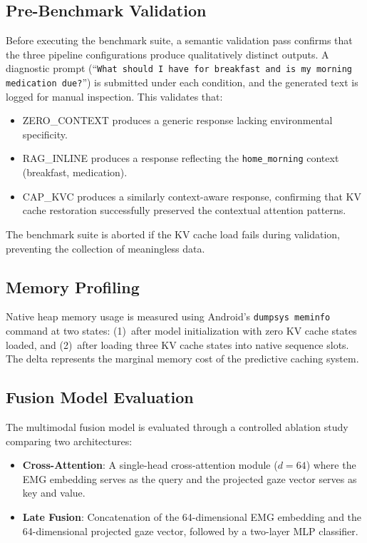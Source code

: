 \subsection{Pre-Benchmark Validation}
\label{sec:validation}

Before executing the benchmark suite, a semantic validation pass confirms that the three pipeline configurations produce qualitatively distinct outputs. A diagnostic prompt (``\texttt{What should I have for breakfast and is my morning medication due?}'') is submitted under each condition, and the generated text is logged for manual inspection. This validates that:

\begin{itemize}
    \item ZERO\_CONTEXT produces a generic response lacking environmental specificity.
    \item RAG\_INLINE produces a response reflecting the \texttt{home\_morning} context (breakfast, medication).
    \item CAP\_KVC produces a similarly context-aware response, confirming that KV cache restoration successfully preserved the contextual attention patterns.
\end{itemize}

The benchmark suite is aborted if the KV cache load fails during validation, preventing the collection of meaningless data.

\subsection{Memory Profiling}
\label{sec:memory_profiling}

Native heap memory usage is measured using Android's \texttt{dumpsys meminfo} command at two states: (1)~after model initialization with zero KV cache states loaded, and (2)~after loading three KV cache states into native sequence slots. The delta represents the marginal memory cost of the predictive caching system.

\subsection{Fusion Model Evaluation}
\label{sec:fusion_eval}

The multimodal fusion model is evaluated through a controlled ablation study comparing two architectures:

\begin{itemize}
    \item \textbf{Cross-Attention}: A single-head cross-attention module ($d = 64$) where the EMG embedding serves as the query and the projected gaze vector serves as key and value.
    \item \textbf{Late Fusion}: Concatenation of the 64-dimensional EMG embedding and the 64-dimensional projected gaze vector, followed by a two-layer MLP classifier.
\end{itemize}

